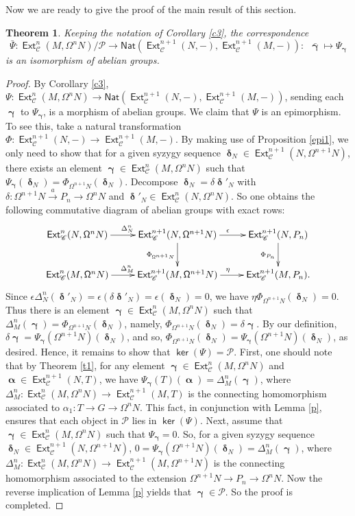 \documentclass[11pt,a4paper]{amsart}
\newcommand{\rt}{\rightarrow}
\newcommand{\lrt}{\longrightarrow}
\newcommand{\st}{\stackrel}
\def\ker{\operatorname{\mathsf{ker}}}
\newcommand{\C}{\mathscr{C} }
\newcommand{\p}{\mathfrak{p} }
\def\Ext{\operatorname{{\mathsf{Ext}}}}
\def\syz{\mathsf{\Omega}}
\def\p{\mathcal P}
\def\al{\operatorname{\boldsymbol{\alpha}}}
\def\ga{\operatorname{\boldsymbol{\gamma}}}
\def\de{\operatorname{\boldsymbol{\delta}}}
\newcommand{\nat}{{\mathsf{Nat}}}
\newtheorem{theorem}{Theorem}[section]
\theoremstyle{definition}
\theoremstyle{plain}
\theoremstyle{definition}
\numberwithin{equation}{section}
\begin{document}
Now we are ready to give the proof of the main result of this section.
\begin{theorem}\label{t2} Keeping the notation of Corollary \ref{c3}, the correspondence
$$\bar{\Psi}: \Ext^n_{\C}(M, \syz^nN)/{\p}\lrt\nat(\Ext^{n+1}_{\C}(N, -), \Ext^{n+1}_{\C}(M, -)):~~\bar{\ga}\mapsto \Psi_{\ga}$$is an isomorphism of abelian groups.
\end{theorem}
\begin{proof}
By Corollary \ref{c3}, $\Psi:\Ext^n_{\C}(M, \syz^nN)\lrt\nat(\Ext^{n+1}_{\C}(N, -), \Ext^{n+1}_{\C}(M, -))$, sending each $\ga$ to $\Psi_{\ga}$, is a morphism of abelian groups.  We claim that $\Psi$ is an epimorphism. To see this, take a natural transformation $\Phi:\Ext^{n+1}_{\C}(N,-)\lrt\Ext^{n+1}_{\C}(M, -)$. By making use of Proposition \ref{epi1}, we only need to show that for a given syzygy sequence $\de_N\in\Ext^{n+1}_{\C}(N, \syz^{n+1}N)$, there exists an element $\ga\in\Ext^n_{\C}(M, \syz^nN)$ such that  $\Psi_{\ga}(\de_N)=\Phi_{\syz^{n+1}N}(\de_N)$. Decompose $\de_N=\delta\de'_N$ with $\delta:\syz^{n+1}N\st{a}\rt P_n\rt\syz^nN$ and $\de'_N\in\Ext^n_{\C}(N, \syz^nN)$. So one obtains the following commutative diagram of abelian groups with exact rows:
\[\xymatrix{\Ext^n_{\C}(N, \syz^nN)\ar[r]^{\Delta^n_N} & \Ext^{n+1}_{\C}(N, \syz^{n+1}N)\ar[r]^{\epsilon}\ar[d]_{\Phi_{\syz^{n+1}N}}& \Ext^{n+1}_{\C}(N, P_n)\ar[d]_{\Phi_{P_n}} \\ \Ext^n_{\C}(M, \syz^nN)\ar[r]^{\Delta^n_M}& \Ext^{n+1}_{\C}(M, \syz^{n+1}N)\ar[r]^{\eta}& \Ext^{n+1}_{\C}(M, P_n) .}\]Since $\epsilon\Delta_N^n(\de'_N)=\epsilon(\delta\de'_N)=\epsilon(\de_N)=0$, we have $\eta\Phi_{\syz^{n+1}N}(\de_N)=0.$ Thus there is an element $\ga\in\Ext^n_{\C}(M, \syz^nN)$ such that $\Delta^n_M(\ga)=\Phi_{\syz^{n+1}N}(\de_N)$, namely, $\Phi_{\syz^{n+1}N}(\de_N)=\delta\ga$. By our definition, $\delta\ga=\Psi_{\ga}(\syz^{n+1}N)(\de_N)$, and so,  $\Phi_{\syz^{n+1}N}(\de_N)=\Psi_{\ga}(\syz^{n+1}N)(\de_N)$, as desired. Hence, it remains to show that $\ker(\Psi)=\p$.  First, one should note that by Theorem \ref{t1}, for any element $\ga\in\Ext^n_{\C}(M, \syz^nN)$ and $\al\in\Ext^{n+1}_{\C}(N, T)$, we have $\Psi_{\ga}(T)(\al)=\Delta_M^n(\ga)$, where $\Delta_M^n:\Ext^n_{\C}(M, \syz^nN)\lrt\Ext^{n+1}_{\C}(M, T)$ is the connecting homomorphism associated to $\alpha_1:T\rt G\rt\syz^nN$. This fact, in conjunction with  Lemma \ref{p}, ensures that each object in $\p$ lies in $\ker(\Psi)$. Next,  assume that $\ga\in\Ext^n_{\C}(M, \syz^nN)$ such that $\Psi_{\ga}=0$. So, for a given syzygy sequence $\de_N\in\Ext^{n+1}_{\C}(N, \syz^{n+1}N)$, $0=\Psi_{\ga}(\syz^{n+1}N)(\de_N)=\Delta_M^n(\ga)$, where $\Delta_M^n:\Ext^n_{\C}(M, \syz^nN)\lrt\Ext^{n+1}_{\C}(M, \syz^{n+1}N)$ is the connecting homomorphism associated to the extension $\syz^{n+1}N\rt P_n\rt\syz^nN$. Now the reverse implication of Lemma \ref{p} yields that $\ga\in\p$. So the proof is completed.
\end{proof}
\end{document}

